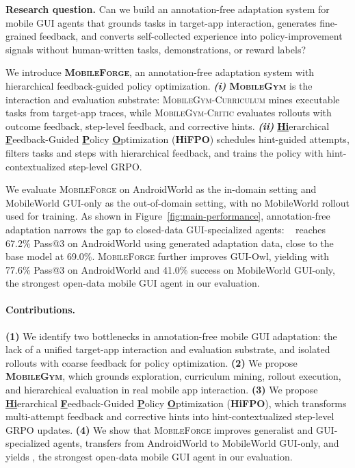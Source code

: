 \documentclass{llmxive}
\providecommand{\ourmethod}{\textsc{MobileForge}\xspace}
\providecommand{\mobilegym}{\textsc{MobileGym}\xspace}
\providecommand{\curriculum}{\textsc{MobileGym-Curriculum}\xspace}
\providecommand{\critic}{\textsc{MobileGym-Critic}\xspace}
\providecommand{\hifpo}{HiFPO\xspace}
\providecommand{\obsbox}[1]{  \begin{tcolorbox}[colframe=black!50, colback=forgeblue!45, boxrule=1pt, arc=2mm,
    top=4pt, bottom=4pt, left=6pt, right=6pt, boxsep=2pt, fontupper=\itshape]
    #1
  \end{tcolorbox}
}
\begin{document}
\obsbox{\textbf{Research question.} Can we build an annotation-free adaptation system for mobile GUI agents that grounds tasks in target-app interaction, generates fine-grained feedback, and converts self-collected experience into policy-improvement signals without human-written tasks, demonstrations, or reward labels?}

We introduce \textbf{\ourmethod}, an annotation-free adaptation system with hierarchical feedback-guided policy optimization. \textbf{\emph{(i)}} \textbf{\mobilegym} is the interaction and evaluation substrate: \curriculum mines executable tasks from target-app traces, while \critic evaluates rollouts with outcome feedback, step-level feedback, and corrective hints. \textbf{\emph{(ii)}} \textbf{\underline{Hi}}erarchical \textbf{\underline{F}}eedback-Guided \textbf{\underline{P}}olicy \textbf{\underline{O}}ptimization (\textbf{\hifpo}) schedules hint-guided attempts, filters tasks and steps with hierarchical feedback, and trains the policy with hint-contextualized step-level GRPO.

We evaluate \ourmethod on AndroidWorld \citep{rawles2024androidworld} as the in-domain setting and MobileWorld GUI-only \citep{kong2026mobileworld} as the out-of-domain setting, with no MobileWorld rollout used for training. As shown in Figure~\ref{fig:main-performance}, annotation-free adaptation narrows the gap to closed-data GUI-specialized agents: ~\citep{bai2025qwen3} reaches 67.2\% Pass@3 on AndroidWorld using generated adaptation data, close to the ~\citep{xu2026mobile} base model at 69.0\%. \ourmethod further improves GUI-Owl, yielding  with 77.6\% Pass@3 on AndroidWorld and 41.0\% success on MobileWorld GUI-only, the strongest open-data mobile GUI agent in our evaluation.

\paragraph{Contributions.}
\textbf{(1)} We identify two bottlenecks in annotation-free mobile GUI adaptation: the lack of a unified target-app interaction and evaluation substrate, and isolated rollouts with coarse feedback for policy optimization.
\textbf{(2)} We propose \textbf{\mobilegym}, which grounds exploration, curriculum mining, rollout execution, and hierarchical evaluation in real mobile app interaction.
\textbf{(3)} We propose \textbf{\underline{Hi}}erarchical \textbf{\underline{F}}eedback-Guided \textbf{\underline{P}}olicy \textbf{\underline{O}}ptimization (\textbf{\hifpo}), which transforms multi-attempt feedback and corrective hints into hint-contextualized step-level GRPO updates.
\textbf{(4)} We show that \ourmethod improves generalist and GUI-specialized agents, transfers from AndroidWorld to MobileWorld GUI-only, and yields , the strongest open-data mobile GUI agent in our evaluation.
\end{document}
